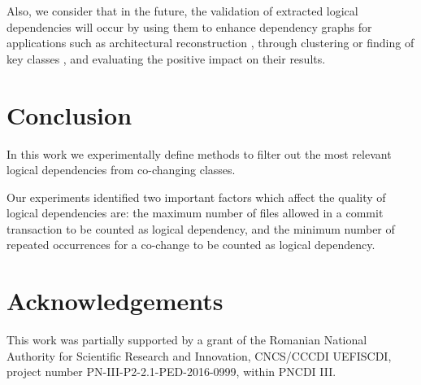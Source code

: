 \documentclass[conference]{IEEEtran}
\begin{document}
Also, we consider that in the future, the validation of extracted logical dependencies will occur by using them to enhance dependency graphs for applications such as architectural reconstruction \cite{Shtern:2012:CMS:2332427.2332428}, \cite{sar}  through clustering \cite{SoraConti} or finding of key classes \cite{PagerankENASE}, and evaluating the positive impact on their results.


\section{Conclusion}
\label{sec:conclusion}
In this work we experimentally define methods to filter out the most relevant logical dependencies from co-changing classes. 

Our experiments identified two important factors which affect the quality of logical dependencies are: the maximum number of files allowed in a commit transaction to be counted as logical dependency, and the minimum number of repeated occurrences for a co-change to be counted as logical dependency.

\section{Acknowledgements}
 \label{sec:ack}

This work was partially supported by a grant of the Romanian National Authority for Scientiﬁc Research and Innovation, CNCS/CCCDI UEFISCDI, project number PN-III-P2-2.1-PED-2016-0999, within PNCDI III.




\end{document}
